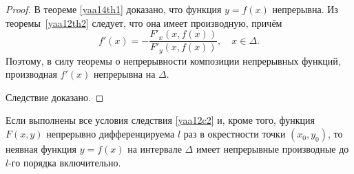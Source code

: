 \begin{proof}
В теореме \ref{yaa14th1} доказано, что функция $y=f(x)$ непрерывна. Из теоремы~\ref{yaa12th2} следует, что она имеет производную, причём
$$
f'(x)=-\frac{F'_x(x,f(x))}{F'_y(x,f(x))},\quad x\in\Delta.
$$
Поэтому, в силу теоремы о непрерывности композиции непрерывных функций, производная $f'(x)$ непрерывна на $\Delta$.

Следствие доказано.
\end{proof}

\begin{cons}
Если выполнены все условия следствия \ref{yaa12c2} и, кроме того, функция $F(x,y)$ непрерывно дифференцируема $l$ раз в окрестности точки $(x_0,y_0)$, то неявная функция $y=f(x)$ на интервале $\Delta$ имеет непрерывные производные до $l$-го порядка включительно.
\end{cons}
